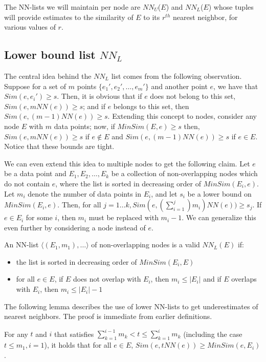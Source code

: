 \documentclass[prodmode,letterpaper]{acmsmall}
\begin{document}
The NN-lists we will maintain per node are $NN_U$($E$) and $NN_L$($E$) whose tuples will
provide estimates to the similarity of $E$ to its $r^{th}$ nearest neighbor, for various
values of $r$.

\subsection{Lower bound list $NN_L$}
The central idea behind the $NN_L$ list comes from the following observation.
Suppose for a set of $m$ points $\lbrace e_1',e_2',\ldots,e_m' \rbrace$ and
another point $e$, we have that $Sim(e,e_i') \geq s$. Then, it is obvious that
if $e$ does not belong to this set, $Sim(e,mNN(e)) \geq s$; and if $e$ belongs
to this set, then $Sim(e,(m-1)NN(e)) \geq s$. Extending this concept to nodes,
consider any node $E$ with $m$ data points; now, if $MinSim(E,e) \geq s$ then,
$Sim(e,mNN(e)) \geq s$ if $e \not  \in  E$  and $Sim(e,(m-1)NN(e)) \geq s$ if $e
\in  E$. Notice that these bounds are tight.

We can even extend this idea to multiple nodes to get the following claim. Let
$e$ be a data point and $E_1,E_2,\ldots,E_k$ be a collection of non-overlapping
nodes which do not contain $e$, where the list is sorted in decreasing order of
$MinSim(E_i,e)$. Let $m_i$ denote the number of data points in $E_i$, and let
$s_i$ be a lower bound on $MinSim(E_i,e)$. Then, for all $j= 1\ldots k, Sim(e,
(\sum_{i=1}^j) m_i)NN(e)) \geq s_j$. If $e \in E_i$ for some $i$, then $m_i$
must be replaced with $m_i-1$. We can generalize this even further by
considering a node instead of $e$.


\begin{definition}
An NN-list $\langle (E_1,m_1),\ldots \rangle$ of non-overlapping nodes is a
valid $NN_L(E)$ if:  
\begin{itemize}
\item the list is sorted in decreasing order of $MinSim(E_i,E)$
\item for all $e \in E$, if $E$ does not overlap with $E_i$, then $m_i \leq
    \vert E_i \vert$ and if $E$ overlaps with $E_i$, then $m_i \leq \vert E_i \vert - 1$
\end{itemize}
\end{definition}


The following lemma describes the use of lower NN-lists to get underestimates of
nearest neighbors. The proof is immediate from earlier definitions.
\begin{lemma}\label{lemma:NNL-lemma}
    For any $t$ and $i$ that satisfies $\sum_{k=1}^{i-1} m_k < t \leq
    \sum_{k=1}^i m_k$ (including the case $t \le m_1, i=1$), it holds that for all $e \in
    E$, $Sim(e,tNN(e)) \geq MinSim(e,E_i)$.
\end{lemma}
\end{document}
